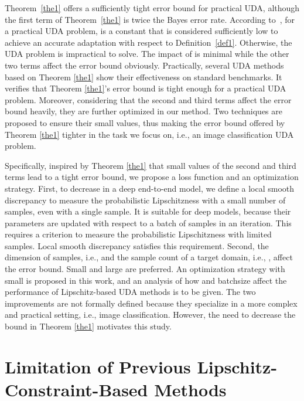 \documentclass[journal,twocolumn]{IEEEtran}
\theoremstyle{definition}
\begin{document}
Theorem~\ref{the1} offers a sufficiently tight error bound for practical UDA, although the first term of Theorem~\ref{the1} is twice the Bayes error rate. According to~\cite{ben2010theory,saito2018maximum}, for a practical UDA problem,  is a constant that is considered sufficiently low to achieve an accurate adaptation with respect to Definition~\ref{def1}. Otherwise, the UDA problem is impractical to solve. The impact of  is minimal while the other two terms affect the error bound obviously. Practically, several UDA methods~\cite{shu2018a,mao2019virtual} based on Theorem \ref{the1} show their effectiveness on standard benchmarks. It verifies that Theorem \ref{the1}'s error bound is tight enough for a practical UDA problem. Moreover, considering that the second and third terms affect the error bound heavily, they are further optimized in our method. Two techniques are proposed to ensure their small values, thus making the error bound offered by Theorem \ref{the1} tighter  in the task we focus on, i.e., an image classification UDA problem.

Specifically, inspired by Theorem \ref{the1} that small values of the second and third terms lead to a tight error bound, we propose a loss function and an optimization  strategy. First, to decrease  in a deep end-to-end model, we define a local smooth discrepancy to measure the  probabilistic Lipschitzness with a small number of samples, even with a single sample. It is suitable for deep models, because their parameters are updated with respect to a batch of samples in an iteration. This requires a criterion to measure the probabilistic Lipschitzness with limited samples. Local smooth discrepancy satisfies this requirement. Second, the dimension of samples, i.e.,  and the sample count of a target domain, i.e., , affect the error bound. Small  and large  are preferred. An optimization strategy with small  is proposed in this work, and an analysis of how  and batchsize affect the performance of Lipschitz-based UDA methods is to be given. The two improvements are not formally defined because they specialize in a more complex and practical setting, i.e., image classification. However, the need to decrease the bound in Theorem \ref{the1} motivates this study.



\section{Limitation of Previous Lipschitz-Constraint-Based Methods}
\end{document}
